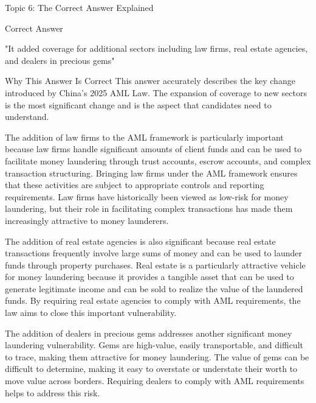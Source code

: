 \documentclass[8pt]{beamer}  %
\newcommand{\correct}{\textcolor{correctgreen}{\ding{51}}}
\begin{document}
	\begin{frame}{Topic 6: The Correct Answer Explained}
		\begin{block}{\large \correct \textcolor{correctgreen}{Correct Answer}}
			\begin{center}
				\Large "It added coverage for additional sectors including law firms, real estate agencies, and dealers in precious gems"
			\end{center}
		\end{block}
		
		\vspace{0.2cm}
		\begin{block}{\large Why This Answer Is Correct}
			This answer accurately describes the key change introduced by China's 2025 AML Law. The expansion of coverage to new sectors is the most significant change and is the aspect that candidates need to understand.
			
			The addition of law firms to the AML framework is particularly important because law firms handle significant amounts of client funds and can be used to facilitate money laundering through trust accounts, escrow accounts, and complex transaction structuring. Bringing law firms under the AML framework ensures that these activities are subject to appropriate controls and reporting requirements. Law firms have historically been viewed as low-risk for money laundering, but their role in facilitating complex transactions has made them increasingly attractive to money launderers.
			
			The addition of real estate agencies is also significant because real estate transactions frequently involve large sums of money and can be used to launder funds through property purchases. Real estate is a particularly attractive vehicle for money laundering because it provides a tangible asset that can be used to generate legitimate income and can be sold to realize the value of the laundered funds. By requiring real estate agencies to comply with AML requirements, the law aims to close this important vulnerability.
			
			The addition of dealers in precious gems addresses another significant money laundering vulnerability. Gems are high-value, easily transportable, and difficult to trace, making them attractive for money laundering. The value of gems can be difficult to determine, making it easy to overstate or understate their worth to move value across borders. Requiring dealers to comply with AML requirements helps to address this risk.
			

\end{block}
\end{frame}
\end{document}
